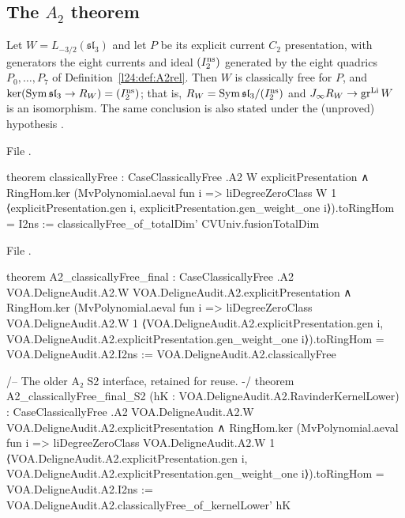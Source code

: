 \subsection{The \texorpdfstring{$A_2$}{A2} theorem}

\begin{theorem}\label{l27:thm:A2}
Let $W=L_{-3/2}(\mathfrak{sl}_3)$ and let $P$ be its explicit current $C_2$ presentation, with generators the eight currents and
ideal $(I_2^{\mathrm{ns}})$ generated by the eight quadrics $P_0,\dots,P_7$ of Definition~\ref{l24:def:A2rel}. Then $W$ is classically
free for $P$, and $\ker(\operatorname{Sym}\mathfrak{sl}_3\to R_W)=(I_2^{\mathrm{ns}})$; that is, $R_W=\operatorname{Sym}\mathfrak{sl}_3/(I_2^{\mathrm{ns}})$
and $J_\infty R_W\to\operatorname{gr}^{\mathrm{Li}}W$ is an isomorphism. The same conclusion is also stated under the (unproved)
hypothesis .
\end{theorem}
\noindent File .
\begin{leancode}
theorem classicallyFree :
    CaseClassicallyFree .A2 W explicitPresentation ∧
      RingHom.ker (MvPolynomial.aeval fun i =>
        liDegreeZeroClass W 1 ⟨explicitPresentation.gen i,
          explicitPresentation.gen_weight_one i⟩).toRingHom = I2ns :=
  classicallyFree_of_totalDim' CVUniv.fusionTotalDim
\end{leancode}
\noindent File .
\begin{leancode}
theorem A2_classicallyFree_final :
    CaseClassicallyFree .A2 VOA.DeligneAudit.A2.W VOA.DeligneAudit.A2.explicitPresentation ∧
      RingHom.ker (MvPolynomial.aeval fun i =>
        liDegreeZeroClass VOA.DeligneAudit.A2.W 1 ⟨VOA.DeligneAudit.A2.explicitPresentation.gen i,
          VOA.DeligneAudit.A2.explicitPresentation.gen_weight_one i⟩).toRingHom =
        VOA.DeligneAudit.A2.I2ns :=
  VOA.DeligneAudit.A2.classicallyFree

/-- The older A₂ S2 interface, retained for reuse. -/
theorem A2_classicallyFree_final_S2 (hK : VOA.DeligneAudit.A2.RavinderKernelLower) :
    CaseClassicallyFree .A2 VOA.DeligneAudit.A2.W VOA.DeligneAudit.A2.explicitPresentation ∧
      RingHom.ker (MvPolynomial.aeval fun i =>
        liDegreeZeroClass VOA.DeligneAudit.A2.W 1 ⟨VOA.DeligneAudit.A2.explicitPresentation.gen i,
          VOA.DeligneAudit.A2.explicitPresentation.gen_weight_one i⟩).toRingHom =
        VOA.DeligneAudit.A2.I2ns :=
  VOA.DeligneAudit.A2.classicallyFree_of_kernelLower' hK
\end{leancode}

